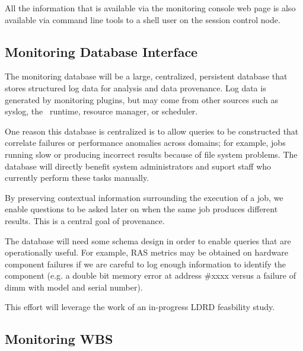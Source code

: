 All the information that is available via the monitoring console web page
is also available via command line tools to a shell user on the session
control node.

\subsection{Monitoring Database Interface}

The monitoring database will be a large, centralized, persistent database
that stores structured log data for analysis and data provenance.
Log data is generated by monitoring plugins, but may come from other sources
such as syslog, the \ngrm\ runtime, resource manager, or scheduler.

One reason this database is centralized is to allow queries
to be constructed that correlate failures or performance anomalies
across domains; for example, jobs running slow or producing incorrect
results because of file system problems.  The database will directly
benefit system administrators and suport staff who currently perform
these tasks manually.

By preserving contextual information surrounding the execution of a job,
we enable questions to be asked later on when the same job produces
different results.  This is a central goal of provenance.

The database will need some schema design in order to enable queries
that are operationally useful.  For example, RAS metrics may be obtained
on hardware component failures if we are careful to log enough information
to identify the component (e.g. a double bit memory error at address \#xxxx
versus a failure of dimm with model and serial number).

This effort will leverage the work of an in-progress LDRD
feasbility study\cite{LogLDRD}.

\subsection{Monitoring WBS}

